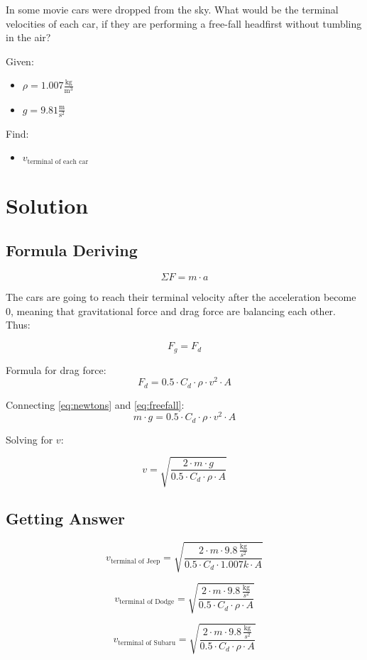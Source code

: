 
In some movie cars were dropped from the sky.
What would be the terminal velocities of each car, if they are
performing a free-fall headfirst without tumbling in the air?

\bigbreak Given:
\begin{itemize}
    \item $ \rho = 1.007 \frac{\text{kg}}{\text{m}^3} $
    \item $ g = 9.81 \frac{\text{m}}{\text{s}^2} $
\end{itemize}

Find:
\begin{itemize}
    \item $ v_{\text{terminal of each car}} $
\end{itemize}


\section*{Solution}
\subsection*{Formula Deriving}

\begin{equation}
    \label{eq:newtons}
    \Sigma F = m \cdot a
\end{equation}

The cars are going to reach their terminal velocity after the acceleration become 0,
meaning that gravitational force and drag force are balancing each other. Thus:

$$ F_g = F_d $$

Formula for drag force:
\begin{equation}
    \label{eq:freefall}
    F_d = 0.5 \cdot C_d \cdot \rho \cdot v^2 \cdot A
\end{equation}

Connecting \ref{eq:newtons} and \ref{eq:freefall}:
$$m \cdot g = 0.5 \cdot C_d \cdot \rho \cdot v^2 \cdot A $$

Solving for $v$:

\begin{equation}
    \label{eq:terminal}
    v = \sqrt{\frac{2 \cdot m \cdot g}{0.5 \cdot C_d \cdot \rho \cdot A}}
\end{equation}

\subsection*{Getting Answer}

$$ v_{\text{terminal of Jeep}} = \sqrt{\frac{2 \cdot m \cdot 9.8 \, \frac{\text{kg}}{s^2}}{0.5 \cdot C_d \cdot 1.007 k \cdot A}} $$

$$ v_{\text{terminal of Dodge}} = \sqrt{\frac{2 \cdot m \cdot 9.8 \, \frac{\text{kg}}{s^2}}{0.5 \cdot C_d \cdot \rho \cdot A}} $$

$$ v_{\text{terminal of Subaru}} = \sqrt{\frac{2 \cdot m \cdot 9.8 \, \frac{\text{kg}}{s^2}}{0.5 \cdot C_d \cdot \rho \cdot A}} $$